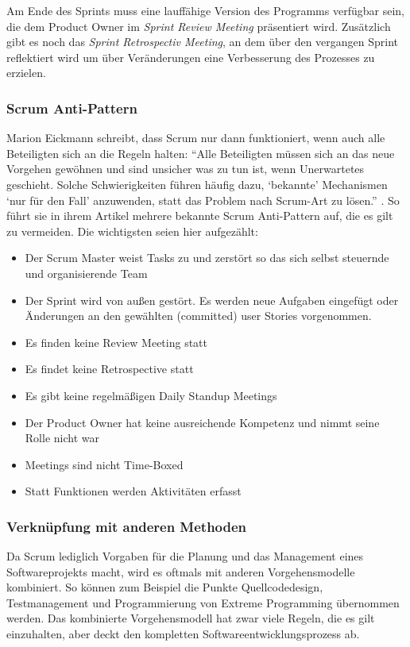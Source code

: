 Am Ende des Sprints muss eine lauffähige Version des Programms verfügbar sein, die dem Product Owner im \emph{Sprint Review Meeting} präsentiert wird. Zusätzlich gibt es noch das \emph{Sprint Retrospectiv Meeting}, an dem über den vergangen Sprint reflektiert wird um über Veränderungen eine Verbesserung des Prozesses zu erzielen.

\subsubsection{Scrum Anti-Pattern}
Marion Eickmann schreibt, dass Scrum nur dann funktioniert, wenn auch alle Beteiligten sich an die Regeln halten: ``Alle Beteiligten müssen sich an das neue Vorgehen gewöhnen und sind unsicher was zu tun ist, wenn Unerwartetes geschieht. Solche Schwierigkeiten führen häufig dazu, `bekannte' Mechanismen `nur für den Fall' anzuwenden, statt das Problem nach Scrum-Art zu lösen.'' \cite[S. 84]{bib:ix2010}. So führt sie in ihrem Artikel mehrere bekannte Scrum Anti-Pattern auf, die es gilt zu vermeiden. Die wichtigsten seien hier aufgezählt:
\begin{itemize}
  \item Der Scrum Master weist Tasks zu und zerstört so das sich selbst steuernde und organisierende Team
  \item Der Sprint wird von außen gestört. Es werden neue Aufgaben eingefügt oder Änderungen an den gewählten (committed) user Stories vorgenommen.
  \item Es finden keine Review Meeting statt
  \item Es findet keine Retrospective statt
  \item Es gibt keine regelmäßigen Daily Standup Meetings
  \item Der Product Owner hat keine ausreichende Kompetenz und nimmt seine Rolle nicht war
  \item Meetings sind nicht Time-Boxed
  \item Statt Funktionen werden Aktivitäten erfasst
\end{itemize} 

\subsubsection{Verknüpfung mit anderen Methoden}
Da Scrum lediglich Vorgaben für die Planung und das Management eines Softwareprojekts macht, wird es oftmals mit anderen Vorgehensmodelle kombiniert. So können zum Beispiel die Punkte Quellcodedesign, Testmanagement und Programmierung von Extreme Programming übernommen werden. Das kombinierte Vorgehensmodell hat zwar viele Regeln, die es gilt einzuhalten, aber deckt den kompletten Softwareentwicklungsprozess ab.

